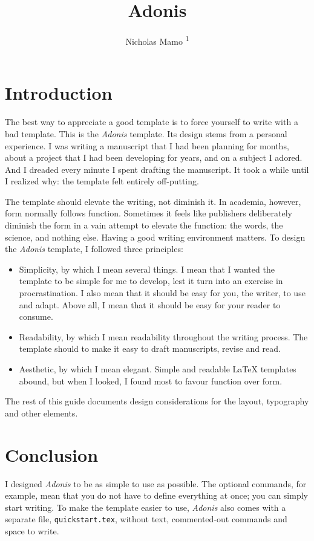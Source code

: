 \documentclass[12pt]{article}
\title{Adonis}
\author{Nicholas Mamo \textsuperscript{1}}
\begin{document}
	\maketitle
	
	\section{Introduction}
		The best way to appreciate a good template is to force yourself to write with a bad template. 
    This is the \textit{Adonis} template.
		Its design stems from a personal experience.
		I was writing a manuscript that I had been planning for months, about a project that I had been developing for years, and on a subject I adored.
		And I dreaded every minute I spent drafting the manuscript.
		It took a while until I realized why: the template felt entirely off-putting.
		
		The template should elevate the writing, not diminish it.
		In academia, however, form normally follows function.
		Sometimes it feels like publishers deliberately diminish the form in a vain attempt to elevate the function: the words, the science, and nothing else.
		Having a good writing environment matters.
		To design the \textit{Adonis} template, I followed three principles:
		
		\begin{itemize}
			\item Simplicity, by which I mean several things.
				  I mean that I wanted the template to be simple for me to develop, lest it turn into an exercise in procrastination.
				  I also mean that it should be easy for you, the writer, to use and adapt.
				  Above all, I mean that it should be easy for your reader to consume.
			
			\item Readability, by which I mean readability throughout the writing process.
				  The template should to make it easy to draft manuscripts, revise and read.
			
			\item Aesthetic, by which I mean elegant.
				  Simple and readable \LaTeX{} templates abound, but when I looked, I found most to favour function over form.
		\end{itemize}
	
		The rest of this guide documents design considerations for the layout, typography and other elements.
	
        \section{Conclusion}
		I designed \textit{Adonis} to be as simple to use as possible.
		The optional commands, for example, mean that you do not have to define everything at once; you can simply start writing.
		To make the template easier to use, \textit{Adonis} also comes with a separate file, \texttt{quickstart.tex}, without text, commented-out commands and space to write.
		
\end{document}
